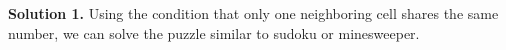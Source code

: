 \begin{solution}{1}
    \textbf{Solution 1.} Using the condition that only one neighboring cell shares the same number,
    we can solve the puzzle similar to sudoku or minesweeper.

    \vspace{0.3cm}


    \begin{figure}[!h]
        \centering
        
    \end{figure}
\end{solution}
